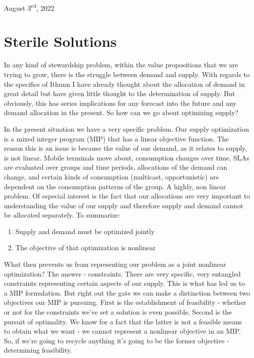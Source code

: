 \documentclass[10pt,a5paper]{book}
\begin{document}
August 3\textsuperscript{rd}, 2022

\chapter{Sterile Solutions}
In any kind of stewardship problem, within the value propositions that we are trying to grow, there is the struggle between demand and supply. With regards to the specifics of Ithunn I have already thought about the allocation of demand in great detail but have given little thought to the determination of supply. But obviously, this has series implications for any forecast into the future and any demand allocation in the present. So how can we go about optimizing supply?

In the present situation we have a very specific problem. Our supply optimization is a mixed integer program (MIP) that has a linear objective function. The reason this is an issue is because the value of our demand, as it relates to supply, is not linear. Mobile terminals move about, consumption changes over time, SLAs are evaluated over groups and time periods, allocations of the demand can change, and certain kinds of consumption (multicast, opportunistic) are dependent on the consumption patterns of the group. A highly, non linear problem. Of especial interest is the fact that our allocations are very important to understanding the value of our supply and therefore supply and demand cannot be allocated separately. To summarize:
\begin{enumerate}
\item Supply and demand must be optimized jointly
\item The objective of that optimization is nonlinear
\end{enumerate}

What then prevents us from representing our problem as a joint nonlinear optimization? The answer - constraints. There are very specific, very entangled constraints representing certain aspects of our supply. This is what has led us to a MIP formulation. But right out the gate we can make a distinction between two objectives our MIP is pursuing. First is the establishment of feasibility - whether or not for the constraints we've set a solution is even possible. Second is the pursuit of optimality. We know for a fact that the latter is not a feasible means to obtain what we want - we cannot represent a nonlinear objective in an MIP. So, if we're going to recycle anything it's going to be the former objective - determining feasibility. 
\end{document}
